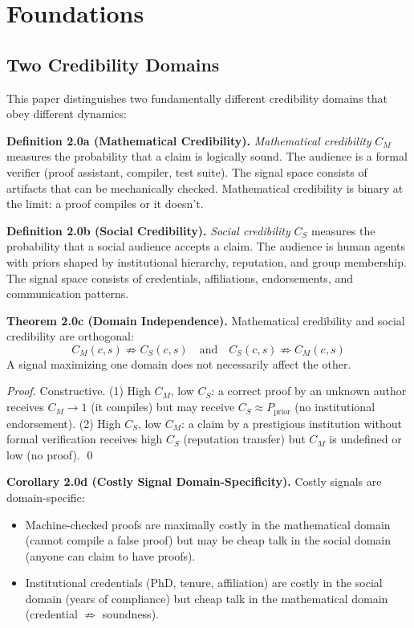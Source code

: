 \section{Foundations}\label{foundations}

\subsection{Two Credibility Domains}\label{two-credibility-domains}

This paper distinguishes two fundamentally different credibility domains that obey different dynamics:

\textbf{Definition 2.0a (Mathematical Credibility).} \emph{Mathematical credibility} $C_M$ measures the probability that a claim is logically sound. The audience is a formal verifier (proof assistant, compiler, test suite). The signal space consists of artifacts that can be mechanically checked. Mathematical credibility is binary at the limit: a proof compiles or it doesn't.

\textbf{Definition 2.0b (Social Credibility).} \emph{Social credibility} $C_S$ measures the probability that a social audience accepts a claim. The audience is human agents with priors shaped by institutional hierarchy, reputation, and group membership. The signal space consists of credentials, affiliations, endorsements, and communication patterns.

\textbf{Theorem 2.0c (Domain Independence).} Mathematical credibility and social credibility are orthogonal:
\[C_M(c, s) \not\Rightarrow C_S(c, s) \quad \text{and} \quad C_S(c, s) \not\Rightarrow C_M(c, s)\]
A signal maximizing one domain does not necessarily affect the other.

\emph{Proof.} Constructive. (1) High $C_M$, low $C_S$: a correct proof by an unknown author receives $C_M \to 1$ (it compiles) but may receive $C_S \approx P_{\text{prior}}$ (no institutional endorsement). (2) High $C_S$, low $C_M$: a claim by a prestigious institution without formal verification receives high $C_S$ (reputation transfer) but $C_M$ is undefined or low (no proof). \qed

\textbf{Corollary 2.0d (Costly Signal Domain-Specificity).} Costly signals are domain-specific:
\begin{itemize}
\item Machine-checked proofs are maximally costly in the mathematical domain (cannot compile a false proof) but may be cheap talk in the social domain (anyone can claim to have proofs).
\item Institutional credentials (PhD, tenure, affiliation) are costly in the social domain (years of compliance) but cheap talk in the mathematical domain (credential $\not\Rightarrow$ soundness).
\end{itemize}

